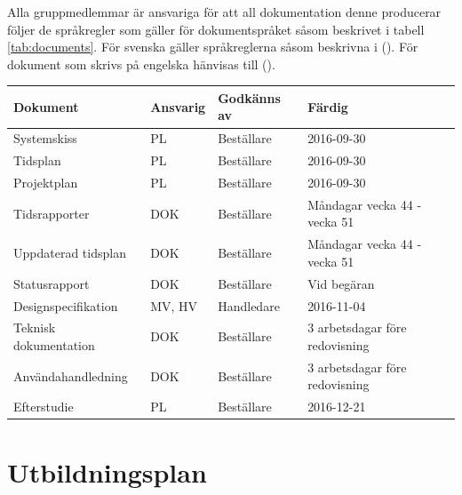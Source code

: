 \documentclass[a4paper,11pt]{article}
\begin{document}
Alla gruppmedlemmar är ansvariga för att all dokumentation denne producerar följer de språkregler som gäller för dokumentspråket såsom beskrivet i tabell \ref{tab:documents}. För svenska gäller språkreglerna såsom beskrivna i  (\cite{Sprakradet2008}). För dokument som skrivs på engelska hänvisas till  (\cite{Ritter2003}).


\label{tab:documents}
\begin{tabular}{|l |l| l| l|}
    \hline
	Dokument              & Ansvarig & Godkänns av & Färdig                         \\\hline
	Systemskiss           & PL       & Beställare  & 2016-09-30                     \\
	Tidsplan              & PL       & Beställare  & 2016-09-30                     \\
	Projektplan           & PL       & Beställare  & 2016-09-30                     \\
	Tidsrapporter         & DOK      & Beställare  & Måndagar vecka 44 - vecka 51   \\
	Uppdaterad tidsplan   & DOK      & Beställare  & Måndagar vecka 44 - vecka 51   \\
	Statusrapport         & DOK      & Beställare  & Vid begäran                    \\%
	Designspecifikation   & MV, HV   & Handledare  & 2016-11-04                     \\
	Teknisk dokumentation & DOK      & Beställare  & 3 arbetsdagar före redovisning \\
	Användahandledning    & DOK      & Beställare  & 3 arbetsdagar före redovisning \\
	Efterstudie           & PL       & Beställare  & 2016-12-21\\
    \hline
\end{tabular}



\section{Utbildningsplan}
\end{document}
